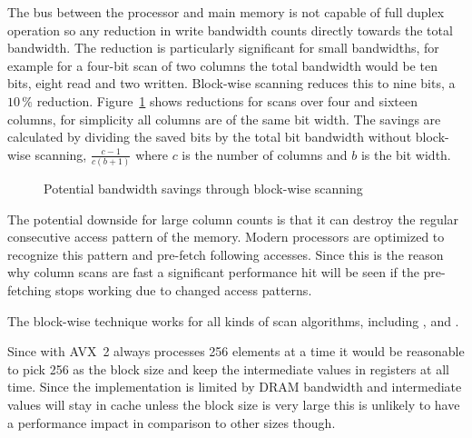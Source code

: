 The bus between the processor and main memory is not capable of full duplex
operation so any reduction in write bandwidth counts directly towards the total
bandwidth. The reduction is particularly significant for small bandwidths, for
example for a four-bit scan of two columns the total bandwidth would be ten
bits, eight read and two written. Block-wise scanning reduces this to nine
bits, a $10\,\%$ reduction. Figure~\ref{fig:blockwisesavings} shows reductions
for scans over four and sixteen columns, for simplicity all columns are of the
same bit width. The savings are calculated by dividing the saved bits by the
total bit bandwidth without block-wise scanning, $\frac{c-1}{c(b+1)}$ where $c$
is the number of columns and $b$ is the bit width.

\begin{figure}[h] \center
{}
\caption{Potential bandwidth savings through block-wise scanning}
\label{fig:blockwisesavings}
\end{figure}

The potential downside for large column counts is that it can destroy the
regular consecutive access pattern of the memory. Modern processors are
optimized to recognize this pattern and pre-fetch following accesses. Since
this is the reason why column scans are fast a significant performance hit will
be seen if the pre-fetching stops working due to changed access patterns.

The block-wise technique works for all kinds of scan algorithms, including
\simdscan{}, \bwv{} and \bs{}.

Since \bwv{} with AVX~2 always processes 256 elements at a time it would be
reasonable to pick 256 as the block size and keep the intermediate values in
registers at all time. Since the \bwv{} implementation is limited by DRAM
bandwidth and intermediate values will stay in cache unless the block size is
very large this is unlikely to have a performance impact in comparison to other
sizes though.
